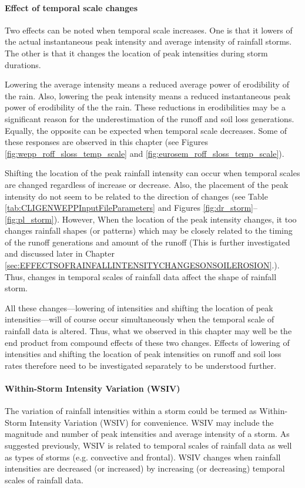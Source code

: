 \paragraph{Effect of temporal scale changes} Two effects can be noted when
temporal scale increases. One is that it lowers of the actual instantaneous peak
intensity and average intensity of rainfall storms. The other is that it
changes the location of peak intensities during storm durations.

Lowering the average intensity means a reduced average power of erodibility
of the rain. Also, lowering the peak intensity means a reduced instantaneous
peak power of erodibility of the the rain. These reductions in erodibilities may
be a significant reason for the underestimation of the runoff and soil loss
generations. Equally, the opposite can be expected when temporal scale
decreases. Some of these responses are observed in this chapter (see Figures
\ref{fig:wepp_roff_sloss_temp_scale} and
\ref{fig:eurosem_roff_sloss_temp_scale}).

Shifting the location of the peak rainfall intensity can occur when temporal
scales are changed regardless of increase or decrease. Also, the placement of
the peak intensity do not seem to be related to the direction of changes (see
Table \ref{tab:CLIGENWEPPInputFileParameters} and Figures
\ref{fig:dr_storm}--\ref{fig:pl_storm}). However, When the location of the peak
intensity changes, it too changes rainfall shapes (or patterns) which may be
closely related to the timing of the runoff generations and amount of the runoff
(This is further investigated and discussed later in Chapter
\ref{sec:EFFECTSOFRAINFALLINTENSITYCHANGESONSOILEROSION}.). Thus, changes in
temporal scales of rainfall data affect the shape of rainfall storm.

All these changes---lowering of intensities and shifting the location of peak
intensities---will of course occur simultaneously when the temporal scale of
rainfall data is altered. Thus, what we observed in this chapter may well be the
end product from compound effects of these two changes. Effects of lowering of
intensities and shifting the location of peak intensities on runoff and
soil loss rates therefore need to be investigated separately to be understood
further.

\paragraph{Within-Storm Intensity Variation (WSIV)} The variation of rainfall
intensities within a storm could be termed as Within-Storm Intensity Variation
(WSIV) for convenience. WSIV may include the magnitude and number of peak
intensities and average intensity of a storm. As suggested previously, WSIV is
related to temporal scales of rainfall data as well as types of storms (e.g.
convective and frontal). WSIV changes when rainfall intensities are decreased
(or increased) by increasing (or decreasing) temporal scales of rainfall data.

